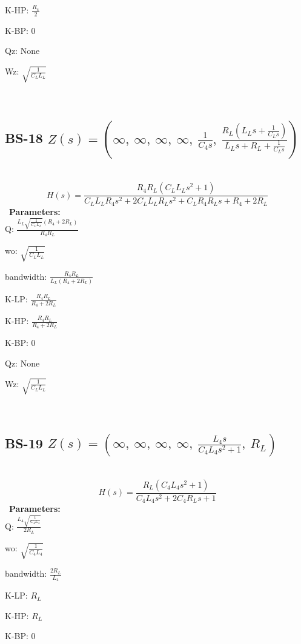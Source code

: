 \documentclass{article}
\begin{document}
K-HP: $\frac{R_{4}}{2}$\ 

K-BP: $0$\ 

Qz: $\text{None}$\ 

Wz: $\sqrt{\frac{1}{C_{L} L_{L}}}$\ 

\ 

\subsection{BS-18 $Z(s) = \left( \infty, \  \infty, \  \infty, \  \infty, \  \frac{1}{C_{4} s}, \  \frac{R_{L} \left(L_{L} s + \frac{1}{C_{L} s}\right)}{L_{L} s + R_{L} + \frac{1}{C_{L} s}}\right)$ } \ 
\textbf{\[H(s) = \frac{R_{4} R_{L} \left(C_{L} L_{L} s^{2} + 1\right)}{C_{L} L_{L} R_{4} s^{2} + 2 C_{L} L_{L} R_{L} s^{2} + C_{L} R_{4} R_{L} s + R_{4} + 2 R_{L}}\] } \ 
\textbf{Parameters:}\\ 

Q: $\frac{L_{L} \sqrt{\frac{1}{C_{L} L_{L}}} \left(R_{4} + 2 R_{L}\right)}{R_{4} R_{L}}$\ 

wo: $\sqrt{\frac{1}{C_{L} L_{L}}}$\ 

bandwidth: $\frac{R_{4} R_{L}}{L_{L} \left(R_{4} + 2 R_{L}\right)}$\ 

K-LP: $\frac{R_{4} R_{L}}{R_{4} + 2 R_{L}}$\ 

K-HP: $\frac{R_{4} R_{L}}{R_{4} + 2 R_{L}}$\ 

K-BP: $0$\ 

Qz: $\text{None}$\ 

Wz: $\sqrt{\frac{1}{C_{L} L_{L}}}$\ 

\ 

\subsection{BS-19 $Z(s) = \left( \infty, \  \infty, \  \infty, \  \infty, \  \frac{L_{4} s}{C_{4} L_{4} s^{2} + 1}, \  R_{L}\right)$ } \ 
\textbf{\[H(s) = \frac{R_{L} \left(C_{4} L_{4} s^{2} + 1\right)}{C_{4} L_{4} s^{2} + 2 C_{4} R_{L} s + 1}\] } \ 
\textbf{Parameters:}\\ 

Q: $\frac{L_{4} \sqrt{\frac{1}{C_{4} L_{4}}}}{2 R_{L}}$\ 

wo: $\sqrt{\frac{1}{C_{4} L_{4}}}$\ 

bandwidth: $\frac{2 R_{L}}{L_{4}}$\ 

K-LP: $R_{L}$\ 

K-HP: $R_{L}$\ 

K-BP: $0$\ 
\end{document}
